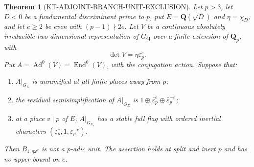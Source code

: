 \documentclass[11pt,a4paper]{article}
\newtheorem{theorem}{Theorem}[section]
\theoremstyle{definition}
\begin{document}
\begin{theorem}[KT-ADJOINT-BRANCH-UNIT-EXCLUSION]
Let $p>3$, let $D<0$ be a fundamental discriminant
prime to $p$, put $E=\mathbf Q(\sqrt D)$ and
$\eta=\chi_D$, and let $e\ge2$ be even with
$(p-1)\nmid2e$.  Let $V$ be a continuous absolutely
irreducible two-dimensional representation of
$G_{\mathbf Q}$ over a finite extension of
$\mathbf Q_p$, with
\[
                  \det V=\eta\varepsilon_p^e.             \tag{AJ.1}
\]
Put $A=\operatorname{Ad}^0(V)=\operatorname{End}^0(V)$,
with the conjugation action.  Suppose that:
\begin{enumerate}
\item $A|_{G_E}$ is unramified at all finite places
      away from $p$;
\item the residual semisimplification of $A|_{G_E}$ is
      $1\oplus\bar\varepsilon_p^e
                  \oplus\bar\varepsilon_p^{-e}$;
\item at a place $v\mid p$ of $E$, $A|_{G_{E_v}}$
      has a stable full flag with ordered inertial
      characters
      $(\varepsilon_p^e,1,\varepsilon_p^{-e})$.
\end{enumerate}
Then $B_{1,\eta\omega^e}$ is not a $p$-adic unit.
The assertion holds at split and inert $p$ and
has no upper bound on $e$.
\end{theorem}
\end{document}
